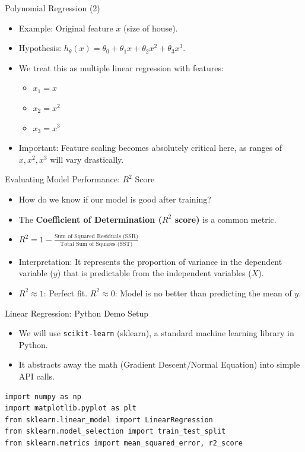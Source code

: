 \documentclass[aspectratio=169]{beamer}
\begin{document}
\begin{frame}{Polynomial Regression (2)}
\begin{itemize}
    \item Example: Original feature $x$ (size of house).
    \item Hypothesis: $h_\theta(x) = \theta_0 + \theta_1 x + \theta_2 x^2 + \theta_3 x^3$.
    \item We treat this as multiple linear regression with features:
    \begin{itemize}
        \item $x_1 = x$
        \item $x_2 = x^2$
        \item $x_3 = x^3$
    \end{itemize}
    \item Important: Feature scaling becomes absolutely critical here, as ranges of $x, x^2, x^3$ will vary drastically.
\end{itemize}
\end{frame}

\begin{frame}{Evaluating Model Performance: $R^2$ Score}
\begin{itemize}
    \item How do we know if our model is good after training?
    \item The \textbf{Coefficient of Determination ($R^2$ score)} is a common metric.
    \item $R^2 = 1 - \frac{\text{Sum of Squared Residuals (SSR)}}{\text{Total Sum of Squares (SST)}}$
    \item Interpretation: It represents the proportion of variance in the dependent variable ($y$) that is predictable from the independent variables ($X$).
    \item $R^2 \approx 1$: Perfect fit. $R^2 \approx 0$: Model is no better than predicting the mean of $y$.
\end{itemize}
\end{frame}

\begin{frame}[fragile]{Linear Regression: Python Demo Setup}
\begin{itemize}
    \item We will use \texttt{scikit-learn} (sklearn), a standard machine learning library in Python.
    \item It abstracts away the math (Gradient Descent/Normal Equation) into simple API calls.
\end{itemize}
\begin{verbatim}
import numpy as np
import matplotlib.pyplot as plt
from sklearn.linear_model import LinearRegression
from sklearn.model_selection import train_test_split
from sklearn.metrics import mean_squared_error, r2_score
\end{verbatim}
\end{frame}
\end{document}

